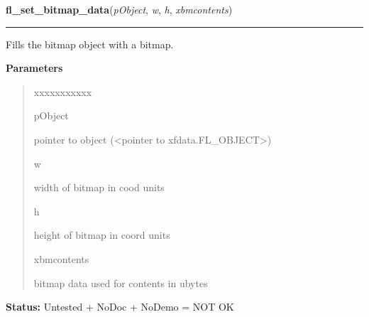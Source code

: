     \label{xformslib:library:fl_set_bitmap_data}

    \vspace{0.5ex}

\hspace{.8\funcindent}\begin{boxedminipage}{\funcwidth}

    \raggedright \textbf{fl\_set\_bitmap\_data}(\textit{pObject}, \textit{w}, \textit{h}, \textit{xbmcontents})

    \vspace{-1.5ex}

    \rule{\textwidth}{0.5\fboxrule}
\setlength{\parskip}{2ex}
    Fills the bitmap object with a bitmap.

\setlength{\parskip}{1ex}
      \textbf{Parameters}
      \vspace{-1ex}

      \begin{quote}
        \begin{Ventry}{xxxxxxxxxxx}

          \item[pObject]

          pointer to object ({\textless}pointer to 
          xfdata.FL\_OBJECT{\textgreater})

          \item[w]

          width of bitmap in cood units

          \item[h]

          height of bitmap in coord units

          \item[xbmcontents]

          bitmap data used for contents in ubytes

        \end{Ventry}

      \end{quote}

\textbf{Status:} Untested + NoDoc + NoDemo = NOT OK



    \end{boxedminipage}

    \label{xformslib:library:fl_set_bitmap_file}

